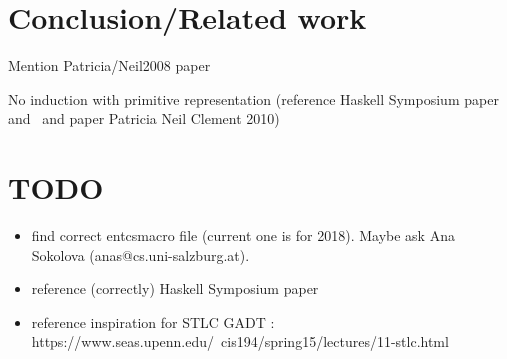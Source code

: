 \documentclass[9pt]{entcs} \usepackage{entcsmacro}
\begin{document}




\section{Conclusion/Related work}

Mention Patricia/Neil2008 paper

No induction with primitive representation (reference Haskell Symposium paper and~\cite{jp19} and paper Patricia Neil Clement 2010)


\section{TODO}

\begin{itemize}
\item find correct entcsmacro file (current one is for 2018). Maybe ask Ana Sokolova (anas@cs.uni-salzburg.at).
\item reference (correctly) Haskell Symposium paper
\item reference inspiration for STLC GADT : https://www.seas.upenn.edu/~cis194/spring15/lectures/11-stlc.html
\end{itemize}


%
%



\end{document}
